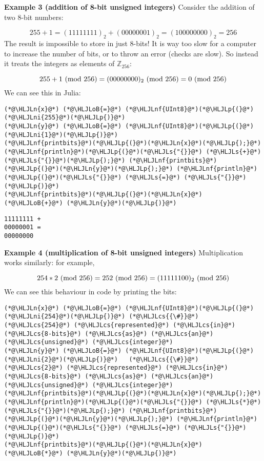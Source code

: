 \documentclass[12pt,a4paper]{article}
\newcommand{\HLJLn}[1]{#1}
\newcommand{\HLJLnf}[1]{\textcolor[RGB]{66,102,213}{#1}}
\newcommand{\HLJLs}[1]{\textcolor[RGB]{201,61,57}{#1}}
\newcommand{\HLJLni}[1]{\textcolor[RGB]{59,151,46}{#1}}
\newcommand{\HLJLoB}[1]{\textcolor[RGB]{102,102,102}{\textbf{#1}}}
\newcommand{\HLJLp}[1]{#1}
\newcommand{\HLJLcs}[1]{\textcolor[RGB]{153,153,119}{\textit{#1}}}
\begin{document}
\textbf{Example 3 (addition of 8-bit unsigned integers)} Consider the addition of two 8-bit numbers:

\[
255 + 1 = (11111111)_2 + (00000001)_2 = (100000000)_2 = 256
\]
The result is impossible to store in just 8-bits! It is way too slow for a computer to increase the number of bits, or to throw an error (checks are slow). So instead it treats the integers as elements of ${\mathbb Z}_{256}$:

\[
255 + 1 \ ({\rm mod}\ 256) = (00000000)_2 \ ({\rm mod}\ 256) = 0 \ ({\rm mod}\ 256)
\]
We can see this in Julia:


\begin{lstlisting}
(*@\HLJLn{x}@*) (*@\HLJLoB{=}@*) (*@\HLJLnf{UInt8}@*)(*@\HLJLp{(}@*)(*@\HLJLni{255}@*)(*@\HLJLp{)}@*)
(*@\HLJLn{y}@*) (*@\HLJLoB{=}@*) (*@\HLJLnf{UInt8}@*)(*@\HLJLp{(}@*)(*@\HLJLni{1}@*)(*@\HLJLp{)}@*)
(*@\HLJLnf{printbits}@*)(*@\HLJLp{(}@*)(*@\HLJLn{x}@*)(*@\HLJLp{);}@*) (*@\HLJLnf{println}@*)(*@\HLJLp{(}@*)(*@\HLJLs{"{}}@*) (*@\HLJLs{+}@*) (*@\HLJLs{"{}}@*)(*@\HLJLp{);}@*) (*@\HLJLnf{printbits}@*)(*@\HLJLp{(}@*)(*@\HLJLn{y}@*)(*@\HLJLp{);}@*) (*@\HLJLnf{println}@*)(*@\HLJLp{(}@*)(*@\HLJLs{"{}}@*) (*@\HLJLs{=}@*) (*@\HLJLs{"{}}@*)(*@\HLJLp{)}@*)
(*@\HLJLnf{printbits}@*)(*@\HLJLp{(}@*)(*@\HLJLn{x}@*) (*@\HLJLoB{+}@*) (*@\HLJLn{y}@*)(*@\HLJLp{)}@*)
\end{lstlisting}

\begin{lstlisting}
11111111 + 
00000001 = 
00000000
\end{lstlisting}


\textbf{Example 4 (multiplication of 8-bit unsigned integers)} Multiplication works similarly: for example,

\[
254 * 2 \ ({\rm mod}\ 256) = 252 \ ({\rm mod}\ 256) = (11111100)_2 \ ({\rm mod}\ 256)
\]
We can see this behaviour in code by printing the bits:


\begin{lstlisting}
(*@\HLJLn{x}@*) (*@\HLJLoB{=}@*) (*@\HLJLnf{UInt8}@*)(*@\HLJLp{(}@*)(*@\HLJLni{254}@*)(*@\HLJLp{)}@*) (*@\HLJLcs{{\#}}@*) (*@\HLJLcs{254}@*) (*@\HLJLcs{represented}@*) (*@\HLJLcs{in}@*) (*@\HLJLcs{8-bits}@*) (*@\HLJLcs{as}@*) (*@\HLJLcs{an}@*) (*@\HLJLcs{unsigned}@*) (*@\HLJLcs{integer}@*)
(*@\HLJLn{y}@*) (*@\HLJLoB{=}@*) (*@\HLJLnf{UInt8}@*)(*@\HLJLp{(}@*)(*@\HLJLni{2}@*)(*@\HLJLp{)}@*)   (*@\HLJLcs{{\#}}@*)   (*@\HLJLcs{2}@*) (*@\HLJLcs{represented}@*) (*@\HLJLcs{in}@*) (*@\HLJLcs{8-bits}@*) (*@\HLJLcs{as}@*) (*@\HLJLcs{an}@*) (*@\HLJLcs{unsigned}@*) (*@\HLJLcs{integer}@*)
(*@\HLJLnf{printbits}@*)(*@\HLJLp{(}@*)(*@\HLJLn{x}@*)(*@\HLJLp{);}@*) (*@\HLJLnf{println}@*)(*@\HLJLp{(}@*)(*@\HLJLs{"{}}@*) (*@\HLJLs{*}@*) (*@\HLJLs{"{}}@*)(*@\HLJLp{);}@*) (*@\HLJLnf{printbits}@*)(*@\HLJLp{(}@*)(*@\HLJLn{y}@*)(*@\HLJLp{);}@*) (*@\HLJLnf{println}@*)(*@\HLJLp{(}@*)(*@\HLJLs{"{}}@*) (*@\HLJLs{=}@*) (*@\HLJLs{"{}}@*)(*@\HLJLp{)}@*)
(*@\HLJLnf{printbits}@*)(*@\HLJLp{(}@*)(*@\HLJLn{x}@*) (*@\HLJLoB{*}@*) (*@\HLJLn{y}@*)(*@\HLJLp{)}@*)
\end{lstlisting}
\end{document}
